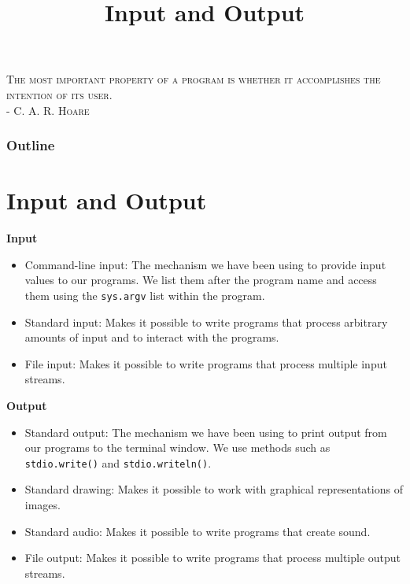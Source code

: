 \documentclass[8pt,a4paper,compress,handout]{beamer}
\title{Input and Output}
\date{}
\begin{document}
\begin{frame}
\begin{flushright}
\tiny \textsc{The most important property of a program is whether it accomplishes the intention of its user. \\ - C. A. R. Hoare}
\end{flushright}
\titlepage
\end{frame}

\begin{frame}
\frametitle{Outline}
\tableofcontents
\end{frame}

\section{Input and Output}
\begin{frame}[fragile]
\begin{center}
\end{center}

\bigskip

\textbf{Input}
\begin{itemize}
\item Command-line input: The mechanism we have been using to provide
input values to our programs. We list them after the program name and access them using the \lstinline{sys.argv} list within the program. 
\item Standard input: Makes it possible to write programs that
process arbitrary amounts of input and to interact with the programs.
\item File input: Makes it possible to write programs that process multiple input streams.
\end{itemize}

\bigskip

\textbf{Output}
\begin{itemize}
\item Standard output: The mechanism we have been using to print output from our programs to the terminal window. We use methods such as \lstinline{stdio.write()} and \lstinline{stdio.writeln()}.
\item Standard drawing: Makes it possible to work with graphical representations of images.
\item Standard audio: Makes it possible to write programs that create sound.
\item File output: Makes it possible to write programs that process multiple output streams.
\end{itemize}
\end{frame}
\end{document}
